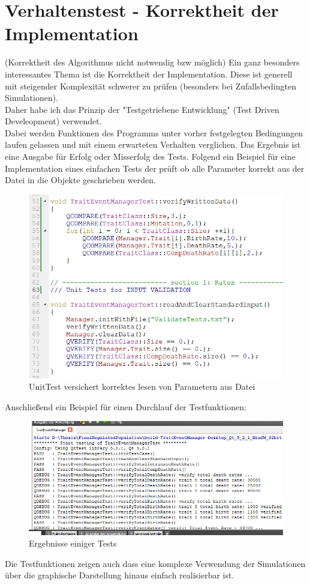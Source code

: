 \documentclass[11pt, a4paper, german]{article}
\begin{document}
\section{Verhaltenstest - Korrektheit der Implementation}
(Korrektheit des Algorithmus nicht notwendig bzw möglich)
Ein ganz besonders interessantes Thema ist die Korrektheit der Implementation. Diese ist generell mit steigender Komplexität schwerer zu prüfen (besonders bei Zufallsbedingten Simulationen).\\
Daher habe ich das Prinzip der "{}Testgetriebene Entwicklung"{}  (Test Driven Develeopment) verwendet.\\
Dabei werden Funktionen des Programms unter vorher festgelegten Bedingungen laufen gelassen und mit einem erwarteten Verhalten verglichen. Das Ergebnis ist eine Ausgabe für Erfolg oder Misserfolg des Tests. Folgend ein Beispiel für eine Implementation eines einfachen Tests der prüft ob alle Parameter korrekt aus der Datei in die Objekte geschrieben werden.
\begin{figure}[H]
	\centering
	\includegraphics[width=0.7\linewidth]{./Pictures/UnitTest}
	\caption[UnitTest]{UnitTest versichert korrektes lesen von Parametern aus Datei}
	\label{Unit Test}
\end{figure}
Anschließend ein Beispiel für einen Durchlauf der Testfunktionen:
\begin{figure}[H]
	\centering
	\includegraphics[width=0.7\linewidth]{./Pictures/TestResult_start}
	\caption[Test Resultat einer Test Datei]{Ergebnisse einiger Tests}
	\label{Test Results}
\end{figure}
Die Testfunktionen zeigen auch dass eine komplexe Verwendung der Simulationen über die graphische Darstellung hinaus einfach realisierbar ist.
\end{document}
